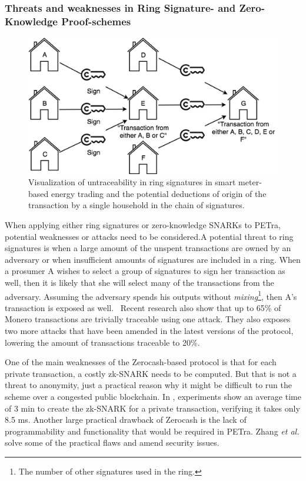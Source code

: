 \subsubsection{Threats and weaknesses in Ring Signature- and Zero-Knowledge Proof-schemes}
\label{transthreat} 
\begin{figure}[t]
\centering
\includegraphics[width=\columnwidth]{ringsigs.png}
\caption{Visualization of untraceability in ring signatures in smart meter-based energy trading and the potential deductions of origin of the transaction by a single household in the chain of signatures.}\label{fig:ringsigs}
\end{figure}
When applying either ring signatures or zero-knowledge SNARKs to PETra, potential weaknesses or attacks need to be considered.A potential threat to ring signatures is when a large amount of the unspent transactions are owned by an adversary or when insufficient amounts of signatures are included in a ring. When a prosumer A wishes to select a group of signatures to sign her transaction as well, then it is likely that she will select many of the transactions from the adversary. Assuming the adversary spends his outputs without \textit{mixing}\footnote{The number of other signatures used in the ring.}, then A's transaction is exposed as well.~\cite{monero2014} Recent research  also show that up to 65\% of Monero transactions are trivially traceable using one attack. They also exposes two more attacks that have been amended in the latest versions of the protocol, lowering the amount of transactions traceable to 20\%.~\cite{monero2014,DBLP:journals/corr/MillerMLN17} 

One of the main weaknesses of the Zerocash-based protocol is that for each private transaction, a costly zk-SNARK needs to be computed. But that is not a threat to anonymity, just a practical reason why it might be difficult to run the scheme over a congested public blockchain. In \cite{Sasson:2014:ZDA:2650286.2650810}, experiments show an average time of 3 min to create the zk-SNARK for a private transaction, verifying it takes only 8.5 ms. Another large practical drawback of Zerocash is the lack of programmability and functionality that would be required in PETra. Zhang \textit{et al.} solve some of the practical flaws and amend security issues.~\cite{zhangz} 

